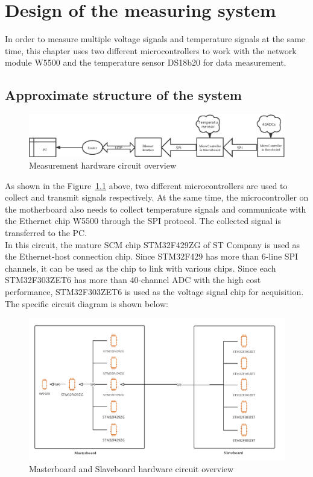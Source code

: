 \chapter{Design of the measuring system}
\label{chap:Design of the measuring system}
In order to measure multiple voltage signals and temperature signals at the same time, this chapter uses two different microcontrollers to work with the network module W5500 and the temperature sensor DS18b20 for data measurement.
\\

\section{Approximate structure of the system}
\label{sec:Approximate structure of the system}

\begin{figure}[!ht]
	\centering
	\includegraphics[width=16cm]{grafiken/4.1.eps}
	\caption{Measurement hardware circuit overview} 
	\label{fig:4.1}
\end{figure}
\FloatBarrier
As shown in the Figure~\ref{fig:4.1} above, two different microcontrollers are used to collect and transmit signals respectively. At the same time, the microcontroller on the motherboard also needs to collect temperature signals and communicate with the Ethernet chip W5500 through the SPI protocol. The collected signal is transferred to the PC.
\\
In this circuit, the mature SCM chip STM32F429ZG of ST Company is used as the Ethernet-host connection chip. Since STM32F429 has more than 6-line SPI channels, it can be used as the chip to link with various chips. Since each STM32F303ZET6 has more than 40-channel ADC with the high cost performance, STM32F303ZET6 is used as the voltage signal chip for acquisition. 
The specific circuit diagram is shown below: 

\begin{figure}[!ht]
	\centering
	\includegraphics[width=16cm]{grafiken/4.2.pdf}
	\caption{Masterboard and Slaveboard hardware circuit overview} 
	\label{fig:4.2}
\end{figure}
\FloatBarrier

